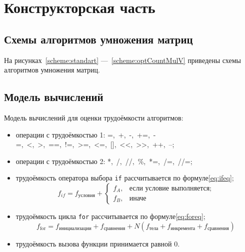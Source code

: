 \chapter{Конструкторская часть}

\section{Схемы алгоритмов умножения матриц}

На рисунках~\ref{scheme:standart} —~\ref{scheme:optCountMulV} приведены схемы алгоритмов умножения матриц.








\section{Модель вычислений}

Модель вычислений для оценки трудоёмкости алгоритмов:
\begin{itemize}[left=\parindent]
	\item операции с трудоёмкостью 1: =,~+,~-,~+=,~-=,~<,~>,~==,~!=,~>=,~<=,~[],~<<,~>>,~++,~--;
	\item операции с трудоёмкостью 2: *,~/,~//,~\%,~*=,~/=,~//=;
	\item трудоёмкость оператора выбора \texttt{if} рассчитывается по формуле\eqref{eq:ifeq};
	\begin{equation} \label{eq:ifeq}
		f_{if} = f_{\text{условия}} +
		\begin{cases}
			f_A, & \text{если условие выполняется;}\\
			f_B, & \text{иначе}
		\end{cases}
	\end{equation}
	\item трудоёмкость цикла \texttt{for} рассчитывается по формуле\eqref{eq:foreq};
	\begin{equation}\label{eq:foreq}
		f_{\text{for}} = f_{\text{инициализации}} + f_{\text{сравнения}} +
		N(f_{\text{тела}} + f_{\text{инкремента}} + f_{\text{сравнения}})
	\end{equation}
	\item трудоёмкость вызова функции принимается равной 0.
\end{itemize}

